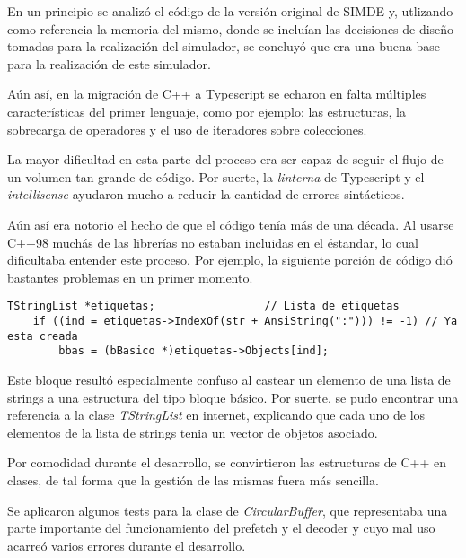 En un principio se analizó el código de la versión original de SIMDE\cite{SIMDE} y, utlizando como
referencia la memoria del mismo, donde se incluían las decisiones de diseño
tomadas para la realización del simulador, se concluyó que era una buena base para la realización 
de este simulador.

\bigskip
Aún así, en la migración de C++ a Typescript se echaron en falta múltiples características del primer lenguaje,
como por ejemplo: las estructuras, la sobrecarga de operadores y el uso de iteradores sobre colecciones.

\bigskip
La mayor dificultad en esta parte del proceso era ser capaz de seguir el flujo de un volumen tan grande
de código. Por suerte, la \textit{linterna} de Typescript y el \textit{intellisense} ayudaron mucho a reducir la cantidad
de errores sintácticos.

\bigskip
Aún así era notorio el hecho de que el código tenía más de una década. Al usarse C++98 muchás de las librerías
no estaban incluidas en el éstandar, lo cual dificultaba entender este proceso. Por ejemplo, la siguiente
porción de código dió bastantes problemas en un primer momento.

\begin{lstlisting}
TStringList *etiquetas;                 // Lista de etiquetas
    if ((ind = etiquetas->IndexOf(str + AnsiString(":"))) != -1) // Ya esta creada
        bbas = (bBasico *)etiquetas->Objects[ind];
\end{lstlisting}

\bigskip
Este bloque resultó especialmente confuso al castear un elemento de una lista de strings 
a una estructura del tipo bloque básico. Por suerte, se pudo encontrar una referencia 
a la clase \textit{TStringList} en internet, explicando que cada uno de los elementos de 
la lista de strings tenia un vector de objetos asociado. 

\bigskip
Por comodidad durante el desarrollo, se convirtieron las estructuras de C++ en clases, de tal forma
que la gestión de las mismas fuera más sencilla.

\bigskip
Se aplicaron algunos tests para la clase de \textit{CircularBuffer}, que representaba una parte importante
del funcionamiento del prefetch y el decoder y cuyo mal uso acarreó varios errores durante el desarrollo.